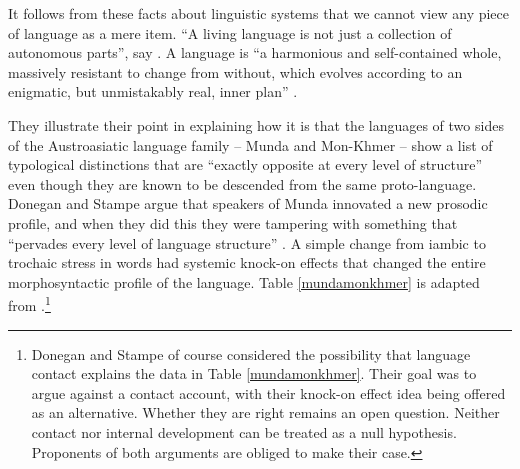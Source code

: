 It follows from these facts about linguistic systems that we cannot 
view any piece of language as a mere item. ``A living language is not 
just a collection of autonomous parts'', say \citet[1]{donegan_rhythm_1983}. A language is ``a harmonious and self-contained whole, massively 
resistant to change from without, which evolves according to an 
enigmatic, but unmistakably real, inner plan'' \citep[1]{donegan_rhythm_1983}. 



They illustrate their point in explaining how it is that the languages 
of two sides of the Austroasiatic language family -- Munda and 
Mon-Khmer -- show a list of typological distinctions that are ``exactly 
opposite at every level of structure'' \citep[111]{donegan_south-east_2002} 
even though they are known to be descended from the same proto-language. Donegan and Stampe argue that speakers of Munda innovated a new prosodic profile, and when they did this they 
were tampering with something that ``pervades every level of language 
structure'' \citep[14]{donegan_rhythm_1983}. A simple change from iambic to trochaic stress in words had systemic knock-on effects that changed the entire morphosyntactic profile of the language. Table \ref{mundamonkhmer}
is adapted from \citet[1--2]{donegan_rhythm_1983}.\footnote{Donegan and Stampe of course considered the possibility that language contact explains the data in Table \ref{mundamonkhmer}. Their goal was to argue against a contact account, with their knock-on effect idea being offered as an alternative. Whether they are right remains an open question. Neither contact nor internal development can be treated as a null hypothesis. Proponents of both arguments are obliged to make their case.}


